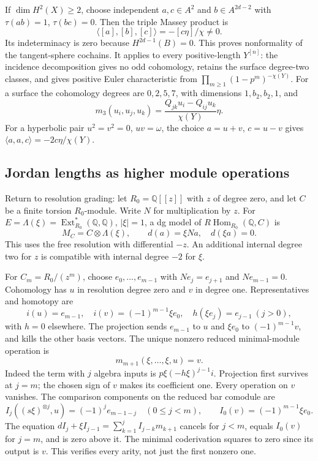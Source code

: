 If $\dim H^2(X)\ge2$, choose independent $a,c\in A^2$
and $b\in A^{2d-2}$ with $\tau(ab)=1$, $\tau(bc)=0$.
Then the triple Massey product is
\begin{equation}\label{cyprim:eq:Massey}
 \langle[a],[b],[c]\rangle=-[c\eta]/\chi\ne0.
\end{equation}
Its indeterminacy is zero because $H^{2d-1}(B)=0$.
This proves nonformality of the tangent-sphere cochains.
It applies to every positive-length $Y^{[n]}$: the
incidence decomposition gives no odd cohomology, retains
the surface degree-two classes, and gives positive
Euler characteristic from
$\prod_{m\ge1}(1-p^m)^{-\chi(Y)}$.
For a surface the cohomology degrees are $0,2,5,7$,
with dimensions $1,b_2,b_2,1$, and
\[
 m_3(u_i,u_j,u_k)
   =\frac{Q_{jk}u_i-Q_{ij}u_k}{\chi(Y)}\eta.
\]
For a hyperbolic pair $u^2=v^2=0$, $uv=\omega$,
the choice $a=u+v$, $c=u-v$ gives
$\langle a,a,c\rangle=-2c\eta/\chi(Y)$.

\subsection{Jordan lengths as higher module operations}

Return to resolution grading: let $R_0=\mathbb Q[[z]]$
with $z$ of degree zero, and let $C$ be a finite torsion
$R_0$-module. Write $N$ for multiplication by $z$.
For $E=\Lambda(\xi)=\operatorname{Ext}_{R_0}^*(\mathbb Q,\mathbb Q)$,
$|\xi|=1$, a dg model of
$R\operatorname{Hom}_{R_0}(\mathbb Q,C)$ is
\begin{equation}\label{cyprim:eq:parameter-module}
 M_C=C\otimes\Lambda(\xi),
 \qquad d(a)=\xi Na,\quad d(\xi a)=0.
\end{equation}
This uses the free resolution with differential $-z$.
An additional internal degree two for $z$ is compatible
with internal degree $-2$ for $\xi$.

For $C_m=R_0/(z^m)$, choose $e_0,\ldots,e_{m-1}$ with
$Ne_j=e_{j+1}$ and $Ne_{m-1}=0$.
Cohomology has $u$ in resolution degree zero and $v$
in degree one. Representatives and homotopy are
\[
 i(u)=e_{m-1},\quad i(v)=(-1)^{m-1}\xi e_0,
 \quad h(\xi e_j)=e_{j-1}\ (j>0),
\]
with $h=0$ elsewhere. The projection sends $e_{m-1}$ to
$u$ and $\xi e_0$ to $(-1)^{m-1}v$, and kills the other basis vectors.
The unique nonzero reduced minimal-module operation is
\begin{equation}\label{cyprim:eq:Jordan-operation}
 m_{m+1}(\xi,\ldots,\xi,u)=v.
\end{equation}
Indeed the term with $j$ algebra inputs is
$p\xi(-h\xi)^{j-1}i$. Projection first survives at
$j=m$; the chosen sign of $v$ makes its coefficient one.
Every operation on $v$ vanishes. The comparison components
on the reduced bar comodule are
\[
 I_j((s\xi)^{\otimes j},u)=(-1)^je_{m-1-j}\quad(0\le j<m),
 \qquad I_0(v)=(-1)^{m-1}\xi e_0.
\]
The equation $dI_j+\xi I_{j-1}
=\sum_{k=1}^j I_{j-k}m_{k+1}$ cancels for $j<m$,
equals $I_0(v)$ for $j=m$, and is zero above it.
The minimal coderivation squares to zero since its
output is $v$. This verifies every arity, not just
the first nonzero one.

